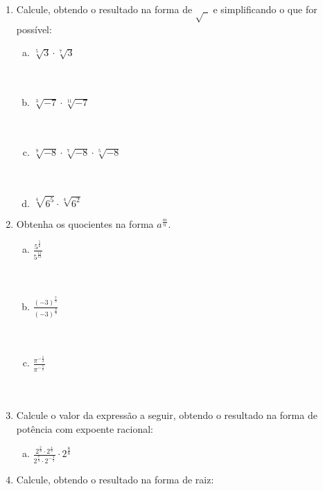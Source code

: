 \documentclass[a4paper,14pt]{article}
\begin{document}
\begin{multicols}{2}
\begin{enumerate}
\begin{enumerate}[a)]
        \end{enumerate}
        \item Calcule, obtendo o resultado na forma de $\sqrt{~~}$ e simplificando o que for possível:
        \begin{enumerate}[a)]
        	\item $\sqrt[5]{3} \cdot \sqrt[7]{3}$ \\\\\\
        	\item $\sqrt[3]{-7} \cdot \sqrt[11]{-7}$ \\\\\\
        	\item $\sqrt[9]{-8} \cdot \sqrt[7]{-8} \cdot \sqrt[5]{-8}$ \\\\\\
        	\item $\sqrt[4]{6^5} \cdot \sqrt[4]{6^2}$
        \end{enumerate}
        \item Obtenha os quocientes na forma $a^\frac{m}{n}$.
        \begin{enumerate}[a)]
        	\item $\frac{5^\frac{5}{6}}{5^\frac{11}{12}}$ \\\\\\
        	\item $\frac{(-3)^\frac{7}{5}}{(-3)^\frac{2}{3}}$ \\\\\\
        	\item $\frac{\pi^{-\frac{1}{3}}}{\pi^{-\frac{5}{7}}}$ \\\\\\
        \end{enumerate}
        \item Calcule o valor da expressão a seguir, obtendo o resultado na forma de potência com expoente racional:
        \begin{enumerate}[a)]
        	\item $\frac{2^\frac{2}{3} \cdot 2^\frac{4}{5}}{2^\frac{7}{3} \cdot 2^{-\frac{3}{5}}} \cdot 2^\frac{8}{8}$
        \end{enumerate}
        \item Calcule, obtendo o resultado na forma de raiz:
        \begin{enumerate}[a)]

\end{enumerate}
\end{enumerate}
\end{multicols}
\end{document}
